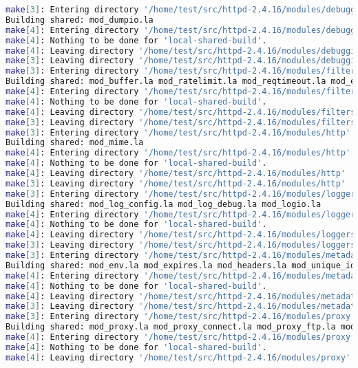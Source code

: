 \begin{lstlisting}[language=bash]
make[3]: Entering directory '/home/test/src/httpd-2.4.16/modules/debugging'
Building shared: mod_dumpio.la
make[4]: Entering directory '/home/test/src/httpd-2.4.16/modules/debugging'
make[4]: Nothing to be done for 'local-shared-build'.
make[4]: Leaving directory '/home/test/src/httpd-2.4.16/modules/debugging'
make[3]: Leaving directory '/home/test/src/httpd-2.4.16/modules/debugging'
make[3]: Entering directory '/home/test/src/httpd-2.4.16/modules/filters'
Building shared: mod_buffer.la mod_ratelimit.la mod_reqtimeout.la mod_ext_filter.la mod_request.la mod_include.la mod_filter.la mod_substitute.la mod_sed.la mod_deflate.la
make[4]: Entering directory '/home/test/src/httpd-2.4.16/modules/filters'
make[4]: Nothing to be done for 'local-shared-build'.
make[4]: Leaving directory '/home/test/src/httpd-2.4.16/modules/filters'
make[3]: Leaving directory '/home/test/src/httpd-2.4.16/modules/filters'
make[3]: Entering directory '/home/test/src/httpd-2.4.16/modules/http'
Building shared: mod_mime.la
make[4]: Entering directory '/home/test/src/httpd-2.4.16/modules/http'
make[4]: Nothing to be done for 'local-shared-build'.
make[4]: Leaving directory '/home/test/src/httpd-2.4.16/modules/http'
make[3]: Leaving directory '/home/test/src/httpd-2.4.16/modules/http'
make[3]: Entering directory '/home/test/src/httpd-2.4.16/modules/loggers'
Building shared: mod_log_config.la mod_log_debug.la mod_logio.la
make[4]: Entering directory '/home/test/src/httpd-2.4.16/modules/loggers'
make[4]: Nothing to be done for 'local-shared-build'.
make[4]: Leaving directory '/home/test/src/httpd-2.4.16/modules/loggers'
make[3]: Leaving directory '/home/test/src/httpd-2.4.16/modules/loggers'
make[3]: Entering directory '/home/test/src/httpd-2.4.16/modules/metadata'
Building shared: mod_env.la mod_expires.la mod_headers.la mod_unique_id.la mod_setenvif.la mod_version.la mod_remoteip.la
make[4]: Entering directory '/home/test/src/httpd-2.4.16/modules/metadata'
make[4]: Nothing to be done for 'local-shared-build'.
make[4]: Leaving directory '/home/test/src/httpd-2.4.16/modules/metadata'
make[3]: Leaving directory '/home/test/src/httpd-2.4.16/modules/metadata'
make[3]: Entering directory '/home/test/src/httpd-2.4.16/modules/proxy'
Building shared: mod_proxy.la mod_proxy_connect.la mod_proxy_ftp.la mod_proxy_http.la mod_proxy_fcgi.la mod_proxy_scgi.la mod_proxy_wstunnel.la mod_proxy_ajp.la mod_proxy_balancer.la mod_proxy_express.la
make[4]: Entering directory '/home/test/src/httpd-2.4.16/modules/proxy'
make[4]: Nothing to be done for 'local-shared-build'.
make[4]: Leaving directory '/home/test/src/httpd-2.4.16/modules/proxy'

\end{lstlisting}
